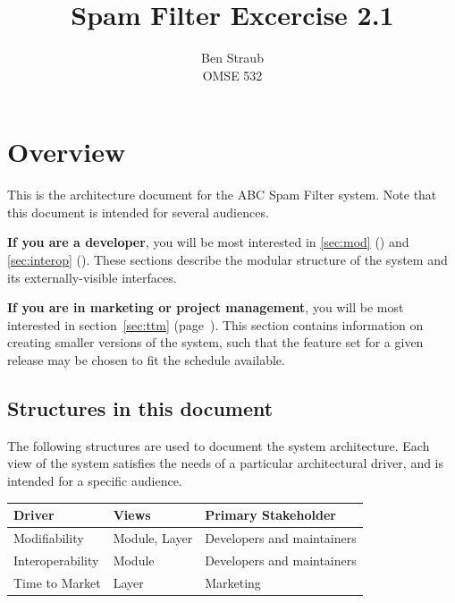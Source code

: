 \documentclass[letterpaper,11pt]{article}
\begin{document}
\author{Ben Straub\\OMSE 532}
\title{Spam Filter Excercise 2.1}
\maketitle

\setcounter{tocdepth}{1}
\tableofcontents
\clearpage


\section{Overview}

This is the architecture document for the ABC Spam Filter system.  Note that
this document is intended for several audiences.

\textbf{If you are a developer}, you will be most interested in
\autoref{sec:mod} () and \autoref{sec:interop}
().  These sections describe the modular structure of
the system and its externally-visible interfaces.

\textbf{If you are in marketing or project management}, you will be most
interested in section~\ref{sec:ttm} (page~\pageref{sec:ttm}).  This section
contains information on creating smaller versions of the system, such that the
feature set for a given release may be chosen to fit the schedule available.

\subsection{Structures in this document}

The following structures are used to document the system architecture.  Each
view of the system satisfies the needs of a particular architectural driver,
and is intended for a specific audience.

\begin{center}
  \begin{tabular}[H]{lll}
    \textbf{Driver}  & \textbf{Views} & \textbf{Primary Stakeholder} \\
    \hline \hline                                                    
    Modifiability    & Module, Layer  & Developers and maintainers   \\
    Interoperability & Module         & Developers and maintainers   \\
    Time to Market   & Layer          & Marketing                    \\
  \end{tabular}
\end{center}
\end{document}
